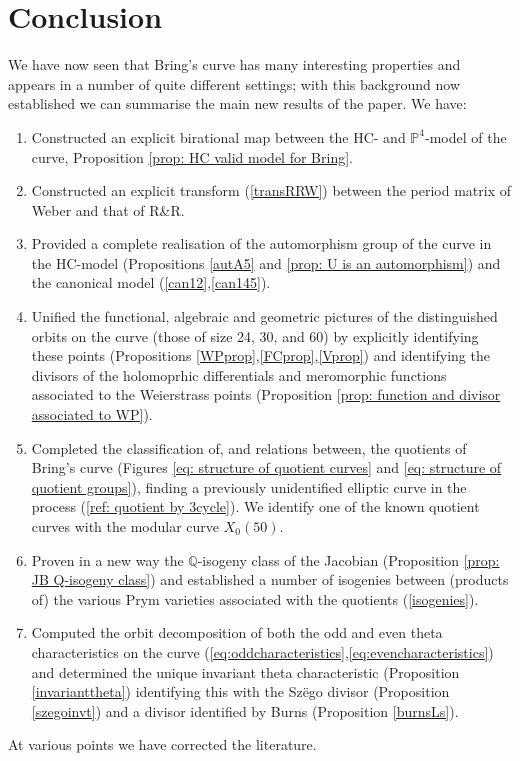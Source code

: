 \documentclass{amsart}
\begin{document}
\section{Conclusion}\label{sec: conclusion}
We have now seen that Bring's curve has many interesting properties and appears in a number of quite different settings; with this background now established we can summarise the main new results of the paper. We have:
\begin{enumerate}
    \item Constructed an explicit birational map between the HC- and $\mathbb{P}^4$-model of the curve, Proposition \ref{prop: HC valid model for Bring}.
    \item Constructed an explicit transform (\ref{transRRW}) between the period matrix of Weber and that of R\&R.
    \item Provided a complete realisation of the automorphism group of the curve in the HC-model (Propositions \ref{autA5}
    and
    \ref{prop: U is an automorphism}) and the canonical model (\ref{can12},\ref{can145}).
    \item Unified the functional, algebraic and geometric pictures of the distinguished orbits on the curve (those of size 24, 30, and 60) by explicitly identifying these points (Propositions \ref{WPprop},\ref{FCprop},\ref{Vprop}) and identifying the divisors of the holomoprhic differentials and meromorphic functions associated to the Weierstrass points (Proposition \ref{prop: function and divisor associated to WP}).
    \item Completed the classification of, and relations between, the quotients of Bring's curve (Figures \ref{eq: structure of quotient curves} and \ref{eq: structure of quotient groups}), finding a previously unidentified elliptic curve in the process (\ref{ref: quotient by 3cycle}). We identify one of the known quotient curves with the modular curve $X_0(50)$.
    \item Proven in a new way the $\mathbb{Q}$-isogeny class of the Jacobian
    (Proposition \ref{prop: JB Q-isogeny class}) and established a number of isogenies between (products of) the various Prym varieties associated with the quotients (\ref{isogenies}).
    \item Computed the orbit decomposition of both the odd and even theta characteristics on the curve (\ref{eq:oddcharacteristics},\ref{eq:evencharacteristics}) and determined the unique invariant theta characteristic (Proposition \ref{invarianttheta}) identifying this with the Sz\"ego divisor (Proposition \ref{szegoinvt}) and a divisor identified by Burns (Proposition \ref{burnsLs}).
\end{enumerate}
At various points we have corrected the literature.
\end{document}
